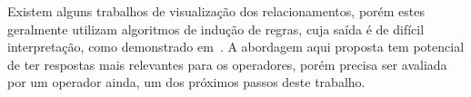 Existem alguns trabalhos de visualização dos relacionamentos, porém estes geralmente utilizam algoritmos de indução de regras, cuja saída é de difícil interpretação, como demonstrado em~\cite{kannanMiningSatelliteTelemetry2016}.
A abordagem aqui proposta tem potencial de ter respostas mais relevantes para os operadores, porém precisa ser avaliada por um operador ainda, um dos próximos passos deste trabalho.

